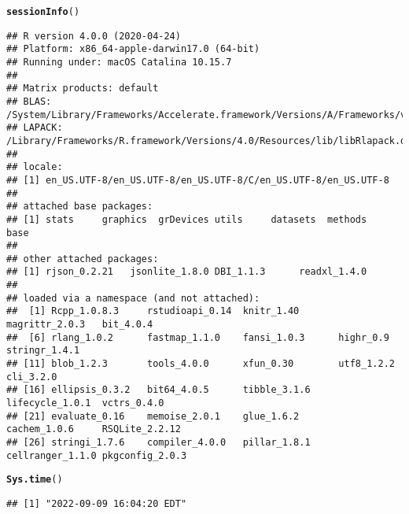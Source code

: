 \documentclass{article}\usepackage[]{graphicx}\usepackage[]{xcolor}
\makeatletter
\newcommand{\hlstd}[1]{\textcolor[rgb]{0.345,0.345,0.345}{#1}}%
\newcommand{\hlkwd}[1]{\textcolor[rgb]{0.737,0.353,0.396}{\textbf{#1}}}%
\newenvironment{kframe}{%
 \def\at@end@of@kframe{}%
 \ifinner\ifhmode%
  \def\at@end@of@kframe{\end{minipage}}%
  \begin{minipage}{\columnwidth}%
 \fi\fi%
 \def\FrameCommand##1{\hskip\@totalleftmargin \hskip-\fboxsep
 \colorbox{shadecolor}{##1}\hskip-\fboxsep
     \hskip-\linewidth \hskip-\@totalleftmargin \hskip\columnwidth}%
 \MakeFramed {\advance\hsize-\width
   \@totalleftmargin\z@ \linewidth\hsize
   \@setminipage}}%
 {\par\unskip\endMakeFramed%
 \at@end@of@kframe}
\newenvironment{knitrout}{}{} %
\makeatother
\begin{document}
\begin{knitrout}
\color{fgcolor}\begin{kframe}
\begin{alltt}
\hlkwd{sessionInfo}\hlstd{()}
\end{alltt}
\begin{verbatim}
## R version 4.0.0 (2020-04-24)
## Platform: x86_64-apple-darwin17.0 (64-bit)
## Running under: macOS Catalina 10.15.7
## 
## Matrix products: default
## BLAS:   /System/Library/Frameworks/Accelerate.framework/Versions/A/Frameworks/vecLib.framework/Versions/A/libBLAS.dylib
## LAPACK: /Library/Frameworks/R.framework/Versions/4.0/Resources/lib/libRlapack.dylib
## 
## locale:
## [1] en_US.UTF-8/en_US.UTF-8/en_US.UTF-8/C/en_US.UTF-8/en_US.UTF-8
## 
## attached base packages:
## [1] stats     graphics  grDevices utils     datasets  methods   base     
## 
## other attached packages:
## [1] rjson_0.2.21   jsonlite_1.8.0 DBI_1.1.3      readxl_1.4.0  
## 
## loaded via a namespace (and not attached):
##  [1] Rcpp_1.0.8.3     rstudioapi_0.14  knitr_1.40       magrittr_2.0.3   bit_4.0.4       
##  [6] rlang_1.0.2      fastmap_1.1.0    fansi_1.0.3      highr_0.9        stringr_1.4.1   
## [11] blob_1.2.3       tools_4.0.0      xfun_0.30        utf8_1.2.2       cli_3.2.0       
## [16] ellipsis_0.3.2   bit64_4.0.5      tibble_3.1.6     lifecycle_1.0.1  vctrs_0.4.0     
## [21] evaluate_0.16    memoise_2.0.1    glue_1.6.2       cachem_1.0.6     RSQLite_2.2.12  
## [26] stringi_1.7.6    compiler_4.0.0   pillar_1.8.1     cellranger_1.1.0 pkgconfig_2.0.3
\end{verbatim}
\begin{alltt}
\hlkwd{Sys.time}\hlstd{()}
\end{alltt}
\begin{verbatim}
## [1] "2022-09-09 16:04:20 EDT"
\end{verbatim}
\end{kframe}
\end{knitrout}
\end{document}
